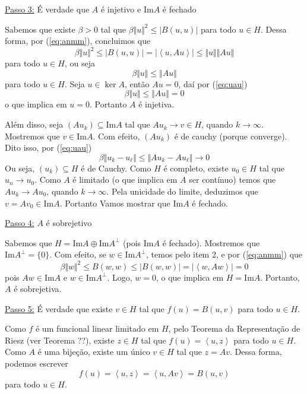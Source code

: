 \documentclass[a4paper, 11pt]{book}
\theoremstyle{definition}
\begin{document}
\begin{prf}
    \underline{Passo 3:} É verdade que $A$ é injetivo e $\mathrm{Im}A$ é fechado

    Sabemos que existe $\beta > 0$ tal que $\beta \Vert u \Vert^2 \leqslant |B(u,u)|$ para todo $u \in H$. Dessa forma, por (\ref{eq:anmm}), concluimos que
    \[
        \beta \Vert u \Vert^2 \leqslant |B(u,u)| = | \left\langle u, Au \right\rangle | \leqslant \Vert u \Vert \Vert Au \Vert
    \]
    para todo $u \in H$, ou seja
    \begin{equation} \label{eq:uau}
        \beta \Vert u \Vert \leqslant \Vert Au \Vert
    \end{equation}
    para todo $u \in H$.
    Seja $u \in \ker A$, então $Au = 0$, daí por (\ref{eq:uau})
    \[
        \beta \Vert u \Vert \leqslant \Vert Au \Vert = 0
    \]
    o que implica em $u = 0$.
    Portanto $A$ é injetiva.

    Além disso, seja $(Au_k) \subseteq \mathrm{Im} A$ tal que $A u_k \to v \in H$, quando $k \to \infty$.
    Mostremos que $v \in \mathrm{Im}A$.
    Com efeito, $(Au_k)$ é de cauchy (porque converge). Dito isso, por (\ref{eq:uau})
    \[
        \beta \Vert u_k - u_\ell \Vert \leqslant \Vert Au_k - Au_\ell \Vert \to 0
    \]
    Ou seja, $(u_k) \subseteq H$ é de Cauchy.
    Como $H$ é completo, existe $u_0 \in H$ tal que $u_n \to u_0$. Como $A$ é limitado (o que implica em $A$ ser contínuo) temos que $Au_k \to Au_0$, quando $k \to \infty$.
    Pela unicidade do limite, deduzimos que $v = Av_0 \in \mathrm{Im}A$.
    Portanto Vamos mostrar que $\mathrm{Im}A$ é fechado.

    \underline{Passo 4:} $A$ é sobrejetivo

    Sabemos que $H = \mathrm{Im}A \oplus \mathrm{Im}A^\perp$ (pois $\mathrm{Im}A$ é fechado). Mostremos que $\mathrm{Im}A^\perp = \{0\}$.
    Com efeito, se $w \in \mathrm{Im}A^\perp$, temos pelo item 2, e por (\ref{eq:anmm}) que
    \[
        \beta \Vert w \Vert^2 \leqslant B(w,w) \leqslant | B(w,w) | = | \left\langle w, Aw \right\rangle | = 0
    \]
    pois $Aw \in \mathrm{Im}A$ e $w \in \mathrm{Im}A^\perp$.
    Logo, $w = 0$, o que implica em $H = \mathrm{Im}A$.
    Portanto, $A$ é sobrejetiva.

    \underline{Passo 5:} É verdade que existe $v \in H$ tal que $f(u) = B(u,v)$ para todo $u \in H$.

    Como $f$ é um funcional linear limitado em $H$, pelo Teorema da Representação de Riesz (ver Teorema ??), existe $z \in H$ tal que $f(u) = \left\langle u, z \right\rangle$ para todo $u \in H$.
    Como $A$ é uma bijeção, existe um único $v \in H$ tal que $z = Av$. Dessa forma, podemos escrever
    \begin{equation} \label{eq:annn}
        f(u) = \left\langle u,z \right\rangle = \left\langle u, Av \right\rangle = B(u,v)
    \end{equation}
    para todo $u \in H$.


\end{prf}
\end{document}
